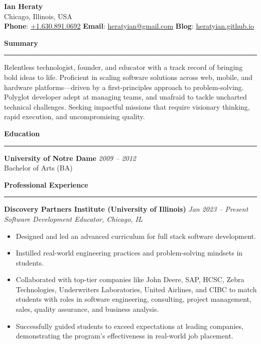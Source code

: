 \documentclass[letterpaper,10pt]{article}
\newcommand{\resheading}[1]{
  \vspace{15pt}
  \textbf{\large #1}
  \vspace{5pt}
  \hrule
  \vspace{10pt}
}
\begin{document}
\begin{center}
    {\LARGE \textbf{Ian Heraty}} \\
    Chicago, Illinois, USA \\
    \textbf{Phone}: \href{tel:+1.630.891.0692}{+1.630.891.0692} \quad\textbullet\quad 
    \textbf{Email}: \href{mailto:heratyian@gmail.com}{heratyian@gmail.com} \quad\textbullet\quad
    \textbf{Blog}: \href{http://heratyian.github.io}{heratyian.github.io}
\end{center}

\resheading{Summary}
Relentless technologist, founder, and educator with a track record of 
bringing bold ideas to life. Proficient in scaling software solutions across 
web, mobile, and hardware platforms—driven by a first-principles approach 
to problem-solving. Polyglot developer adept at 
managing teams, and unafraid to tackle uncharted technical challenges. 
Seeking impactful missions that require visionary thinking, rapid execution, 
and uncompromising quality.

\resheading{Education}
\textbf{University of Notre Dame} \hfill \textit{2009 -- 2012}\\
Bachelor of Arts (BA)

\resheading{Professional Experience}

\textbf{Discovery Partners Institute (University of Illinois)} \hfill \textit{Jan 2023 -- Present}\\
\emph{Software Development Educator, Chicago, IL}\\
\begin{itemize}
  \item Designed and led an advanced curriculum for full stack software development.
  \item Instilled real-world engineering practices and problem-solving mindsets in students.
  \item Collaborated with top-tier companies like John Deere, SAP, HCSC, Zebra Technologies, Underwriters Laboratories, United Airlines, and CIBC to match students with roles in software engineering, consulting, project management, sales, quality assurance, and business analysis.
  \item Successfully guided students to exceed expectations at leading companies, demonstrating the program's effectiveness in real-world job placement.
\end{itemize}
\end{document}
